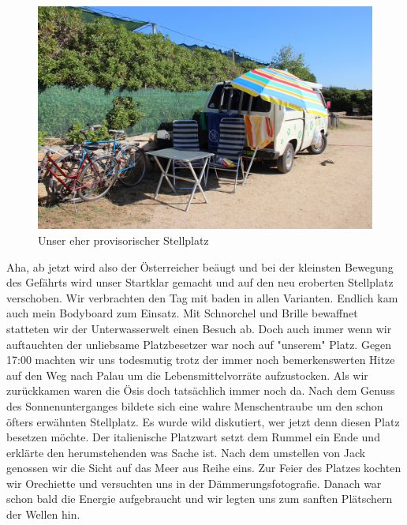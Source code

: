 \begin{figure}[hb]
    \centering
    \includegraphics[width=\textwidth]{../Bilder/Sardinien/17.jpg}
    \caption{Unser eher provisorischer Stellplatz}
    \label{img:Sardinien}
\end{figure}

Aha, ab jetzt wird also der Österreicher beäugt und bei der kleinsten Bewegung des Gefährts wird unser Startklar gemacht und auf den neu eroberten Stellplatz verschoben.
Wir verbrachten den Tag mit baden in allen Varianten.
Endlich kam auch mein Bodyboard zum Einsatz.
Mit Schnorchel und Brille bewaffnet statteten wir der Unterwasserwelt einen Besuch ab.
Doch auch  immer wenn wir auftauchten der unliebsame Platzbesetzer war noch auf "unserem" Platz.
Gegen 17:00 machten wir uns todesmutig trotz der immer noch bemerkenswerten Hitze auf den Weg nach Palau um die Lebensmittelvorräte aufzustocken.
Als wir zurückkamen waren die Ösis doch tatsächlich immer noch da.
Nach dem Genuss des Sonnenunterganges bildete sich eine wahre Menschentraube um den schon öfters erwähnten Stellplatz.
Es wurde wild diskutiert, wer jetzt denn diesen Platz besetzen möchte.
Der italienische Platzwart setzt dem Rummel ein Ende und erklärte den herumstehenden was Sache ist.
Nach dem umstellen von Jack genossen wir die Sicht auf das Meer aus Reihe eins.
Zur Feier des Platzes kochten wir Orechiette und versuchten uns in der Dämmerungsfotografie.
Danach war schon bald die Energie aufgebraucht und wir legten uns zum sanften Plätschern der Wellen hin.

